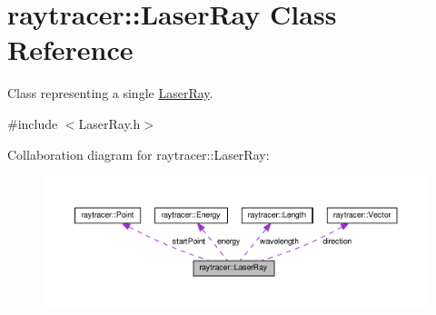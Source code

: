 \hypertarget{classraytracer_1_1LaserRay}{}\section{raytracer\+:\+:Laser\+Ray Class Reference}
\label{classraytracer_1_1LaserRay}


Class representing a single \hyperlink{classraytracer_1_1LaserRay}{Laser\+Ray}.  




{\ttfamily \#include $<$Laser\+Ray.\+h$>$}



Collaboration diagram for raytracer\+:\+:Laser\+Ray\+:
\nopagebreak
\begin{figure}[H]
\begin{center}
\leavevmode
\includegraphics[width=350pt]{classraytracer_1_1LaserRay__coll__graph}
\end{center}
\end{figure}
